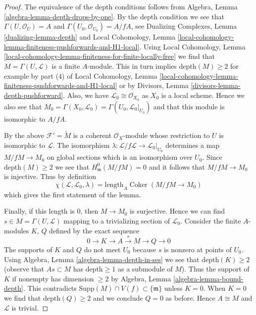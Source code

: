 \documentclass[10pt,a4paper]{amsart}
\theoremstyle{plain}
\theoremstyle{definition}
\theoremstyle{remark}
\numberwithin{equation}{subsection}
\def\Coker{\mathop{\mathrm{Coker}}}
\begin{document}
\begin{proof}
The equivalence of the depth conditions follows from
Algebra, Lemma \ref{algebra-lemma-depth-drops-by-one}.
By the depth condition we see that
$\Gamma(U, \mathcal{O}_U) = A$ and
$\Gamma(U_0, \mathcal{O}_{U_0}) = A/fA$, see
Dualizing Complexes, Lemma \ref{dualizing-lemma-depth} and
Local Cohomology, Lemma
\ref{local-cohomology-lemma-finiteness-pushforwards-and-H1-local}.
Using Local Cohomology, Lemma
\ref{local-cohomology-lemma-finiteness-for-finite-locally-free}
we find that $M = \Gamma(U, \mathcal{L})$ is a finite $A$-module.
This in turn implies $\text{depth}(M) \geq 2$ for example by
part (4) of Local Cohomology, Lemma
\ref{local-cohomology-lemma-finiteness-pushforwards-and-H1-local}
or by Divisors, Lemma \ref{divisors-lemma-depth-pushforward}.
Also, we have $\mathcal{L}_0 \cong \mathcal{O}_{X_0}$
as $X_0$ is a local scheme. Hence we also see that
$M_0 = \Gamma(X_0, \mathcal{L}_0) = \Gamma(U_0, \mathcal{L}_0|_{U_0})$
and that this module is isomorphic to $A/fA$.

\medskip\noindent
By the above $\mathcal{F}' = \widetilde{M}$ is a coherent
$\mathcal{O}_X$-module whose restriction to $U$ is isomorphic to $\mathcal{L}$.
The isomorphism $\lambda : \mathcal{L}/f\mathcal{L} \to \mathcal{L}_0|_{U_0}$
determines a map $M/fM \to M_0$ on global sections
which is an isomorphism over $U_0$.
Since $\text{depth}(M) \geq 2$ we see
that $H^0_\mathfrak m(M/fM) = 0$ and it follows that
$M/fM \to M_0$ is injective. Thus by definition
$$
\chi(\mathcal{L}, \mathcal{L}_0, \lambda) =
\text{length}_A \Coker(M/fM \to M_0)
$$
which gives the first statement of the lemma.

\medskip\noindent
Finally, if this length is $0$, then $M \to M_0$ is surjective.
Hence we can find $s \in M = \Gamma(U, \mathcal{L})$
mapping to a trivializing section of $\mathcal{L}_0$.
Consider the finite $A$-modules $K$, $Q$ defined by the exact
sequence
$$
0 \to K \to A \xrightarrow{s} M \to Q \to 0
$$
The supports of $K$ and $Q$ do not meet $U_0$ because $s$
is nonzero at points of $U_0$. Using
Algebra, Lemma \ref{algebra-lemma-depth-in-ses}
we see that $\text{depth}(K) \geq 2$ (observe that
$As \subset M$ has $\text{depth} \geq 1$ as a submodule of $M$).
Thus the support of $K$ if nonempty has dimension $\geq 2$ by
Algebra, Lemma \ref{algebra-lemma-bound-depth}.
This contradicts $\text{Supp}(M) \cap V(f) \subset \{\mathfrak m\}$
unless $K = 0$. When $K = 0$ we find that
$\text{depth}(Q) \geq 2$ and we conclude
$Q = 0$ as before. Hence $A \cong M$ and
$\mathcal{L}$ is trivial.
\end{proof}
\end{document}
